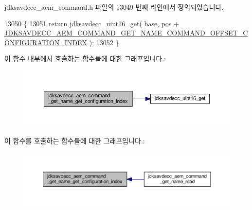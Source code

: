 jdksavdecc\+\_\+aem\+\_\+command.\+h 파일의 13049 번째 라인에서 정의되었습니다.


\begin{DoxyCode}
13050 \{
13051     \textcolor{keywordflow}{return} \hyperlink{group__endian_ga3fbbbc20be954aa61e039872965b0dc9}{jdksavdecc\_uint16\_get}( base, pos + 
      \hyperlink{group__command__get__name_gacaa20b6280c941c43cfdd535adb8f61e}{JDKSAVDECC\_AEM\_COMMAND\_GET\_NAME\_COMMAND\_OFFSET\_CONFIGURATION\_INDEX}
       );
13052 \}
\end{DoxyCode}


이 함수 내부에서 호출하는 함수들에 대한 그래프입니다.\+:
\nopagebreak
\begin{figure}[H]
\begin{center}
\leavevmode
\includegraphics[width=350pt]{group__command__get__name_ga9c3952ca18ccf16a029a5cbacb687263_cgraph}
\end{center}
\end{figure}




이 함수를 호출하는 함수들에 대한 그래프입니다.\+:
\nopagebreak
\begin{figure}[H]
\begin{center}
\leavevmode
\includegraphics[width=350pt]{group__command__get__name_ga9c3952ca18ccf16a029a5cbacb687263_icgraph}
\end{center}
\end{figure}


